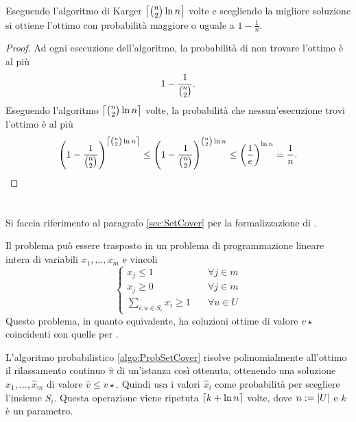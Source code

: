 \begin{corollario}
	Eseguendo l'algoritmo di Karger $\left\lceil \binom{n}{2}\ln n \right\rceil$ volte e scegliendo la migliore soluzione si ottiene l'ottimo con probabilità maggiore o uguale a $1-\frac{1}{n}$.
\end{corollario}
\begin{proof}
	Ad ogni esecuzione dell'algoritmo, la probabilità di non trovare l'ottimo è al più
	\begin{equation*}
		1-\frac{1}{\binom{n}{2}}\text.
	\end{equation*}
	Eseguendo l'algoritmo $\left\lceil \binom{n}{2}\ln n \right\rceil$ volte, la probabilità che nessun'esecuzione trovi l'ottimo è al più
	\begin{equation*}
		\left(1-\frac{1}{{\binom{n}{2}}}\right)^{\left\lceil \binom{n}{2}\ln n \right\rceil}\leq \left(1-\frac{1}{{\binom{n}{2}}}\right)^{{\binom{n}{2}}\ln n}\leq\left(\frac{1}{e}\right)^{\ln n}=\frac{1}{n}\text.
	\end{equation*}
\end{proof}



\section{\MinSetCover}
Si faccia riferimento al paragrafo \ref{sec:SetCover} per la formalizzazione di \MinSetCover.

Il problema può essere trasposto in un problema di programmazione lineare intera di variabili $x_1,\dots,x_m$ e vincoli
\begin{equation*}
	\begin{cases}
		x_j \leq 1                   & \quad \forall j\in m \\
		x_j \geq 0                   & \quad \forall j\in m \\
		\sum_{i:u\in S_i} x_i \geq 1 & \quad \forall u\in U
	\end{cases}
\end{equation*}
Questo problema, in quanto equivalente, ha soluzioni ottime di valore $v\star$ coincidenti con quelle per \MinSetCover.

L'algoritmo probabilistico \ref{algo:ProbSetCover} risolve polinomialmente all'ottimo il rilassamento continuo $\hat\pi$ di un'istanza così ottenuta, ottenendo una soluzione $\hat x_1,\dots,\hat x_m$ di valore $\hat v\leq v\star$.
Quindi usa i valori $\hat x_i$ come probabilità per scegliere l'insieme $S_i$.
Questa operazione viene ripetuta $\left\lceil k+\ln n \right\rceil$ volte, dove $n:=| U |$ e $k$ è un parametro.

